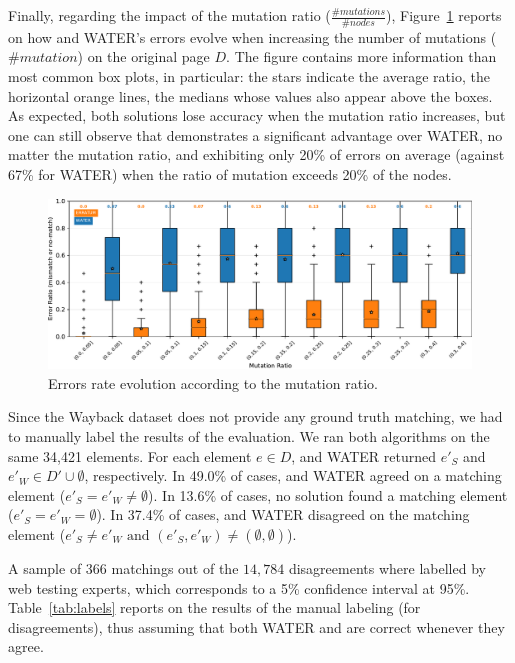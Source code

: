 Finally, regarding the impact of the mutation ratio ($\frac{\#mutations}{\#nodes}$), Figure~\ref{fig:erroRatioMutation} reports on how \erratum and WATER's errors evolve when increasing the number of mutations ($\#mutation$) on the original page $D$.
The figure contains more information than most common box plots, in particular: the stars indicate the average ratio, the horizontal orange lines, the medians whose values also appear above the boxes.
As expected, both solutions lose accuracy when the mutation ratio increases, but one can still observe that \erratum demonstrates a significant advantage over WATER, no matter the mutation ratio, and exhibiting only 20\% of errors on average (against 67\% for WATER) when the ratio of mutation exceeds 20\% of the nodes.

\begin{figure}[]
  \centering
  \includegraphics[width=1\linewidth]{erratum/errorPerMutationRatio}
  \caption{Errors rate evolution according to the mutation ratio.}
  \label{fig:erroRatioMutation}
\end{figure}


\vspace{6pt}
Since the {\sc Wayback} dataset does not provide any ground truth matching, we had to manually label the results of the evaluation.
We ran both algorithms on the same 34,421 elements.
For each element $e \in D$, \erratum and WATER returned $e'_{S}$ and $e'_{W} \in D' \cup \emptyset$, respectively.
In 49.0\% of cases, \erratum and WATER agreed on a matching element ($e'_{S} = e'_{W} \ne \emptyset$).
In 13.6\% of cases, no solution found a matching element ($e'_{S} = e'_{W}= \emptyset$).
In 37.4\% of cases, \erratum and WATER disagreed on the matching element ($e'_{S} \ne e'_{W} \text{ and } (e'_{S}, e'_{W}) \ne (\emptyset, \emptyset)$).

A sample of $366$ matchings out of the $14,784$ disagreements where labelled by web testing experts, which corresponds to a 5\% confidence interval at 95\%.
Table~\ref{tab:labels} reports on the results of the manual labeling (for disagreements), thus assuming that both WATER and \erratum are correct whenever they agree.

